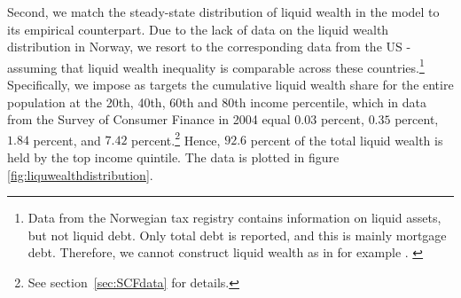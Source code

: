 \documentclass[11pt]{article}
\begin{document}
Second, we match the steady-state distribution of liquid wealth in the model to its empirical counterpart. Due to the lack of data on the liquid wealth distribution in Norway, we resort to the corresponding data from the US - assuming that liquid wealth inequality is comparable across these countries.\footnote{Data from the Norwegian tax registry contains information on liquid assets, but not liquid debt. Only total debt is reported, and this is mainly mortgage debt. Therefore, we cannot construct liquid wealth as in for example \citet{kaplan2014model}. \label{foot:liqwealth}} Specifically, we impose as targets the cumulative liquid wealth share for the entire population at the 20th, 40th, 60th and 80th income percentile, which in data from the Survey of Consumer Finance in 2004 equal $0.03$ percent, $0.35$ percent, $1.84$ percent, and $7.42$ percent.\footnote{See section~\ref{sec:SCFdata} for details.} Hence, $92.6$ percent of the total liquid wealth is held by the top income quintile. The data is plotted in figure \ref{fig:liquwealthdistribution}.
\end{document}
